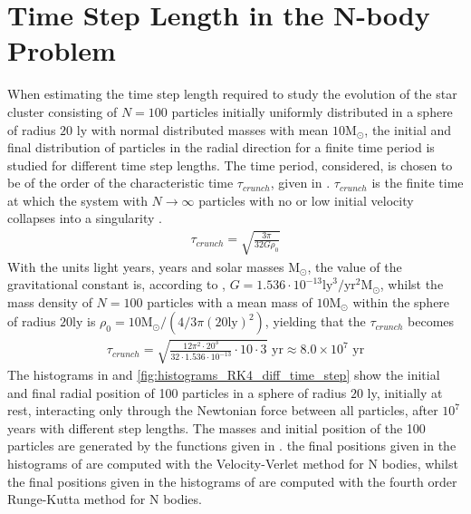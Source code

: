 \section{Time Step Length in the N-body Problem}
\label{sec:TimeStepLengthNbody}
When estimating the time step length required to study the evolution of the star cluster consisting of $N=100$ particles initially uniformly distributed in a sphere of radius $20$ ly with normal distributed masses with mean $10{\textrm{M}}_{\odot}$, the initial and final distribution of particles in the radial direction for a finite time period is studied for different time step lengths. 
The time period, considered, is chosen to be of the order of the characteristic time $\tau _{crunch}$, given in .
$\tau _{crunch}$ is the finite time at which the system with $N \rightarrow \infty$ particles with no or low initial velocity collapses into a singularity \cite{Project5_CompPhys}. 
\begin{align}
	\tau _{crunch} = \sqrt{\frac{3\pi}{32G\rho_0}}
	\label{eq:t_crunch}
\end{align}
With the units light years, years and solar masses ${\textrm{M}}_{\odot}$, the value of the gravitational constant is, according to , $G = 1.536\cdot 10^{-13} \textrm{ly}^3 / \textrm{yr}^2 {\textrm{M}}_{\odot}$, whilst the mass density of $N=100$ particles with a mean mass of $10 {\textrm{M}}_{\odot}$ within the sphere of radius $20 \text{ly}$ is 
$\rho_0 = 10 {\textrm{M}}_{\odot} / (4/3 \pi (20 \text{ly})^2)$, yielding that the $\tau _{crunch}$ becomes
\begin{align}
	\tau _{crunch} = \sqrt{\frac{12\pi^2\cdot 20^3}{32\cdot 1.536\cdot 10^{-13}}\cdot 10\cdot 3} \text{ yr} 
	\approx 8.0\times 10^7 \text{ yr}
\end{align}
The histograms in  and \ref{fig:histograms_RK4_diff_time_step} show the initial and final radial position of 100 particles in a sphere of radius $20$ ly, initially at rest, interacting only through the Newtonian force between all particles, after $10^7$ years with different step lengths. 
The masses and initial position of the 100 particles are generated by the functions given in .
the final positions given in the histograms of  are computed with the Velocity-Verlet method for N bodies, whilst the final positions given in the histograms of  are computed with the fourth order Runge-Kutta method for N bodies.
